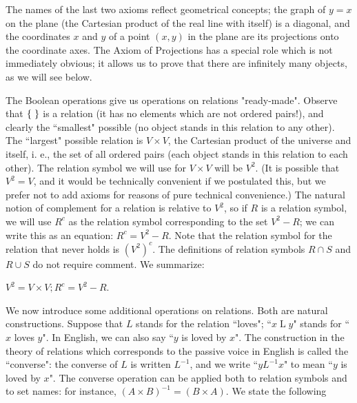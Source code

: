 The names of the last two axioms reflect geometrical concepts;
the graph of $y = x$ on the plane (the Cartesian product of the real
line with itself) is a diagonal, and the coordinates $x$ and $y$ of a
point $(x,y)$ in the plane are its projections onto the
coordinate 
axes.  The Axiom of Projections has a special role which is not
immediately obvious; it allows us to prove that there are infinitely
many objects, as we will see below.

The Boolean operations give us operations on
relations "ready-made"\hspace{-2pt}.
Observe that $\mbox{$\{\;\}$}$ is a
relation (it has no elements 
which are not ordered pairs!), and clearly the ``smallest"
possible (no object stands in this relation to any other).  The ``largest"
possible relation is $V \times V$, the Cartesian
product of the
universe and itself, i. e., the set of all
ordered pairs (each object
stands in this relation to each other).  The relation symbol we will
use for $V \times V$ will be $V^2$.  (It is possible that $V^2=V$, and
it would be technically convenient if we postulated this, but we
prefer not to add axioms for reasons of pure technical convenience.)
The natural notion of complement for a relation
is relative to $V^2$, 
so if $R$ is a relation symbol, we will use $R^c$ as the
relation 
symbol corresponding to the set $V^2 - R$; we can write this as an
equation: $R^c = V^2 - R$.  Note that the relation symbol for
the 
relation that never holds is $(V^2)^c$.  The definitions of relation
symbols $R \cap S$ and $R \cup S$ do not require comment.  We
summarize:

\begin{definition}
 $V^2 = V \times V; R^c = V^2 - R$.
\end{definition}

We now introduce some additional operations on relations.
Both are natural constructions.  Suppose that $L$ stands for the
relation ``loves"; ``$x \mathrel{L} y$" stands for ``$x$ loves $y$".  In
English, we can 
also say ``$y$ is loved by $x$".  The construction in the theory of
relations which corresponds to the passive voice in English is called
the ``converse":  the converse of $L$ is written $L^{-1}$, and we write
``$y \mathrel{L^{-1}} x$" to mean ``$y$ is loved by $x$".  The converse
operation can be applied both to relation symbols and to set
names: for instance, $(A \times B)^{-1} = (B \times A)$.
We state the following

